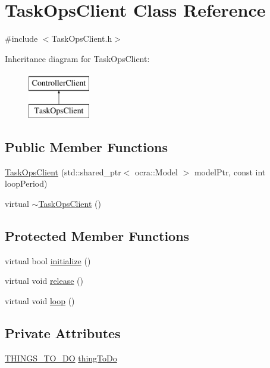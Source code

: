 \hypertarget{classTaskOpsClient}{}\section{Task\+Ops\+Client Class Reference}
\label{classTaskOpsClient}


{\ttfamily \#include $<$Task\+Ops\+Client.\+h$>$}

Inheritance diagram for Task\+Ops\+Client\+:\begin{figure}[H]
\begin{center}
\leavevmode
\includegraphics[height=2.000000cm]{classTaskOpsClient}
\end{center}
\end{figure}
\subsection*{Public Member Functions}
\begin{DoxyCompactItemize}
\item 
\hyperlink{classTaskOpsClient_a6d3842de3255a78526ced7953428452c}{Task\+Ops\+Client} (std\+::shared\+\_\+ptr$<$ ocra\+::\+Model $>$ model\+Ptr, const int loop\+Period)
\item 
virtual \hyperlink{classTaskOpsClient_a80a5c71dd04ab7a07d4ffb8116244cdd}{$\sim$\+Task\+Ops\+Client} ()
\end{DoxyCompactItemize}
\subsection*{Protected Member Functions}
\begin{DoxyCompactItemize}
\item 
virtual bool \hyperlink{classTaskOpsClient_a6f5e4c20c1d5f5df28dcc58e3cb4adb0}{initialize} ()
\item 
virtual void \hyperlink{classTaskOpsClient_af54d37bc4a2631c5c47e23d8156f6e95}{release} ()
\item 
virtual void \hyperlink{classTaskOpsClient_a7e7dfab7af0404f0b008da2844ab573e}{loop} ()
\end{DoxyCompactItemize}
\subsection*{Private Attributes}
\begin{DoxyCompactItemize}
\item 
\hyperlink{TaskOpsClient_8h_a0140057ae3fbe1db5f5c418dfc67d9db}{T\+H\+I\+N\+G\+S\+\_\+\+T\+O\+\_\+\+DO} \hyperlink{classTaskOpsClient_a3409c4ef6b396943397b5bd9237f0a40}{thing\+To\+Do}
\end{DoxyCompactItemize}


